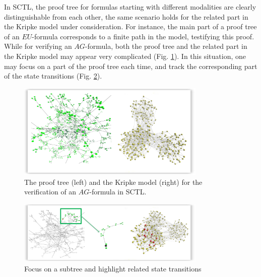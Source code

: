 \documentclass[runningheads]{llncs}
\begin{document}
In \textsf{SCTL}, the proof tree for formulas starting with different modalities are clearly distinguishable from each other,
the same scenario holds for the related part in the Kripke model under consideration.
For instance, the main part of a proof tree of an $EU$-formula corresponds to a finite path in the model,
testifying this proof.
While for verifying an $AG$-formula,
both the proof tree and the related part in the Kripke model may appear very complicated
(Fig. \ref{fig:ag_proof}).
In this situation, one may focus on a part of the proof tree each time,
and track the corresponding part of the state transitions (Fig. \ref{fig:ag_part_detail}).
\begin{figure}[h!]
\centering
\includegraphics[width=9cm]{./ag_proof_state.png}
\caption{The proof tree (left) and the Kripke model (right) for the verification of an $AG$-formula in \textsf{SCTL}.}
\label{fig:ag_proof}
\end{figure}
\begin{figure}[h!]
\centering
\includegraphics[width=9cm]{./ag_part_detail.png}
\caption{Focus on a subtree and highlight related state transitions}
\label{fig:ag_part_detail}
\end{figure}
 
\end{document}
